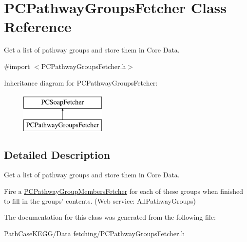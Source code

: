 \hypertarget{interface_p_c_pathway_groups_fetcher}{
\section{PCPathwayGroupsFetcher Class Reference}
\label{interface_p_c_pathway_groups_fetcher}
}


Get a list of pathway groups and store them in Core Data.  




{\ttfamily \#import $<$PCPathwayGroupsFetcher.h$>$}

Inheritance diagram for PCPathwayGroupsFetcher:\begin{figure}[h!]
\begin{center}
\leavevmode
\includegraphics[height=2.000000cm]{kegg_doc/interface_p_c_pathway_groups_fetcher}
\end{center}
\end{figure}


\subsection{Detailed Description}
Get a list of pathway groups and store them in Core Data. 

Fire a \hyperlink{interface_p_c_pathway_group_members_fetcher}{PCPathwayGroupMembersFetcher} for each of these groups when finished to fill in the groups' contents. (Web service: {\ttfamily AllPathwayGroups}) 

The documentation for this class was generated from the following file:\begin{DoxyCompactItemize}
\item 
PathCaseKEGG/Data fetching/PCPathwayGroupsFetcher.h\end{DoxyCompactItemize}
